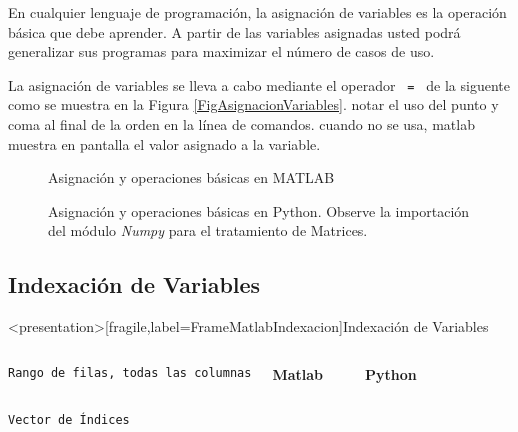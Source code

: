   En cualquier lenguaje de programación, la asignación 
  de variables es la operación básica que debe aprender.
  A partir de las variables asignadas usted podrá generalizar sus
  programas para maximizar el número de casos de uso. 

  La asignación de variables se lleva a cabo mediante
  el operador \texttt{ = } de la siguente como se muestra
  en la Figura \autoref{FigAsignacionVariables}. notar el uso 
  del punto y coma al final de la orden en la línea de 
  comandos. cuando no se usa, matlab muestra en pantalla
  el valor asignado a la variable.

\begin{figure}
\caption{Asignación y operaciones básicas en MATLAB\label{FigAsignacionVariables}}
\end{figure}

\begin{figure}
\caption{Asignación y operaciones básicas en Python. Observe la importación del 
        módulo \protect\emph{Numpy} para el tratamiento de Matrices. \protect\label{FigAsignacionVariablesPython}}
\end{figure}

\mode* 

\subsection{Indexación de Variables}

\begin{frame}<presentation>[fragile,label=FrameMatlabIndexacion]{Indexación de Variables}

\begin{columns}[T]
  \vspace{0.5cm}
\flushright \texttt{Rango de filas, todas las columnas}

  \textbf{Matlab}

\begin{codeblock}
  
\end{codeblock}
  \textbf{Python}
\begin{codeblock}
%  
  
\end{codeblock}

\end{columns}
  \vspace{0.5cm}
\begin{columns}[T]
\hfill \texttt{Vector de Índices}

\begin{codeblock}
  
\end{codeblock}

  \begin{codeblock}
    
  \end{codeblock}
\end{columns}
\end{frame}

